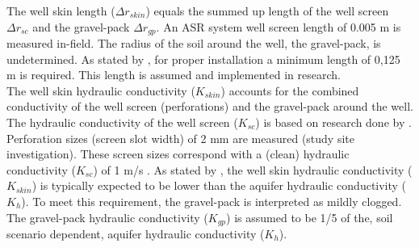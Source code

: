The well skin length ($\Delta r_{skin}$) equals the summed up length of the well screen ${\Delta r_{sc}}$ and the gravel-pack ${\Delta r_{gp}}$. An ASR system well screen length of 0.005 m is measured in-field. The radius of the soil around the well, the gravel-pack, is undetermined. As stated by \citep{Bot2016}, for proper installation a minimum length of 0,125 m is required. This length is assumed and implemented in research. \\
The well skin hydraulic conductivity ($K_{skin}$) accounts for the combined conductivity of the well screen (perforations) and the gravel-pack around the well. The hydraulic conductivity of the well screen ($K_{sc}$) is based on research done by \citet{Houben2015}. Perforation sizes (screen slot width) of 2 mm are measured (study site investigation). These screen sizes correspond with a (clean) hydraulic conductivity ($K_{sc}$) of 1 m/s \citep{Houben2015}. As stated by \citet{LeonardF.KonikowGeorgeZ.HornbergerKeithJ.Halford2009}, the well skin hydraulic conductivity ($K_{skin}$) is typically expected to be lower than the aquifer hydraulic conductivity ($K_{h}$). To meet this requirement, the gravel-pack is interpreted as mildly clogged. The gravel-pack hydraulic conductivity ($K_{gp}$) is assumed to be 1/5 of the, soil scenario dependent, aquifer hydraulic conductivity ($K_{h}$). \\



